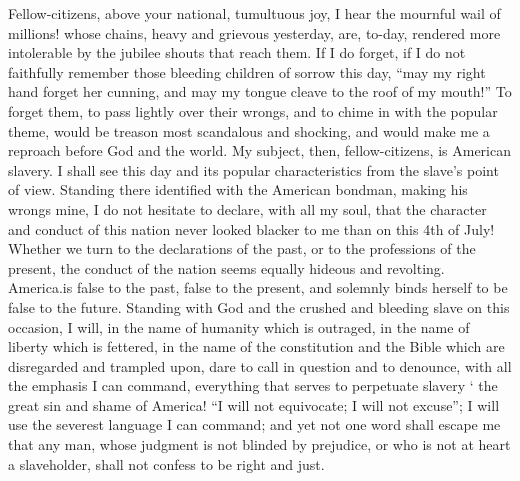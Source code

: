 \documentclass[a4paper]{amsbook}
\begin{document}
Fellow-citizens, above your national, tumultuous joy, I hear the mournful wail of millions! whose chains, heavy and grievous yesterday, are, to-day, rendered more intolerable by the jubilee shouts that reach them. If I do forget, if I do not faithfully remember those bleeding children of sorrow this day, “may my right hand forget her cunning, and may my tongue cleave to the roof of my mouth!” To forget them, to pass lightly over their wrongs, and to chime in with the popular theme, would be treason most scandalous and shocking, and would make me a reproach before God and the world. My subject, then, fellow-citizens, is American slavery. I shall see this day and its popular characteristics from the slave's point of view. Standing there identified with the American bondman, making his wrongs mine, I do not hesitate to declare, with all my soul, that the character and conduct of this nation never looked blacker to me than on this 4th of July! Whether we turn to the declarations of the past, or to the professions of the present, the conduct of the nation seems equally hideous and revolting. America.is false to the past, false to the present, and solemnly binds herself to be false to the future. Standing with God and the crushed and bleeding slave on this occasion, I will, in the name of humanity which is outraged, in the name of liberty which is fettered, in the name of the constitution and the Bible which are disregarded and trampled upon, dare to call in question and to denounce, with all the emphasis I can command, everything that serves to perpetuate slavery ‘ the great sin and shame of America! “I will not equivocate; I will not excuse”; I will use the severest language I can command; and yet not one word shall escape me that any man, whose judgment is not blinded by prejudice, or who is not at heart a slaveholder, shall not confess to be right and just.
\end{document}
